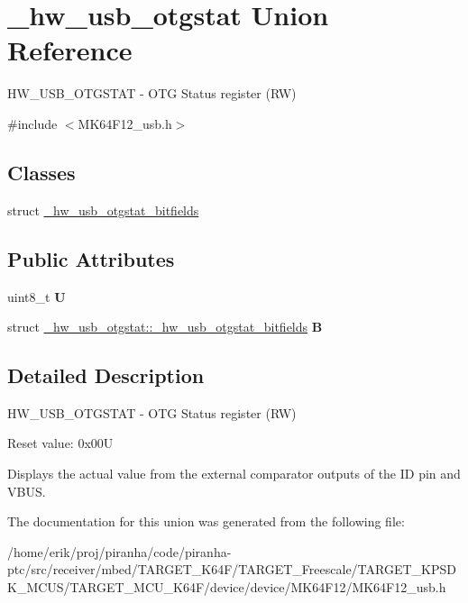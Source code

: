 \hypertarget{union__hw__usb__otgstat}{}\section{\+\_\+hw\+\_\+usb\+\_\+otgstat Union Reference}
\label{union__hw__usb__otgstat}


H\+W\+\_\+\+U\+S\+B\+\_\+\+O\+T\+G\+S\+T\+AT -\/ O\+TG Status register (RW)  




{\ttfamily \#include $<$M\+K64\+F12\+\_\+usb.\+h$>$}

\subsection*{Classes}
\begin{DoxyCompactItemize}
\item 
struct \hyperlink{struct__hw__usb__otgstat_1_1__hw__usb__otgstat__bitfields}{\+\_\+hw\+\_\+usb\+\_\+otgstat\+\_\+bitfields}
\end{DoxyCompactItemize}
\subsection*{Public Attributes}
\begin{DoxyCompactItemize}
\item 
uint8\+\_\+t {\bfseries U}\hypertarget{union__hw__usb__otgstat_ab99fc21beed2694667260b17464eca76}{}\label{union__hw__usb__otgstat_ab99fc21beed2694667260b17464eca76}

\item 
struct \hyperlink{struct__hw__usb__otgstat_1_1__hw__usb__otgstat__bitfields}{\+\_\+hw\+\_\+usb\+\_\+otgstat\+::\+\_\+hw\+\_\+usb\+\_\+otgstat\+\_\+bitfields} {\bfseries B}\hypertarget{union__hw__usb__otgstat_aacf9a8bd13c4f3cd526ed2afe9b4d3a3}{}\label{union__hw__usb__otgstat_aacf9a8bd13c4f3cd526ed2afe9b4d3a3}

\end{DoxyCompactItemize}


\subsection{Detailed Description}
H\+W\+\_\+\+U\+S\+B\+\_\+\+O\+T\+G\+S\+T\+AT -\/ O\+TG Status register (RW) 

Reset value\+: 0x00U

Displays the actual value from the external comparator outputs of the ID pin and V\+B\+US. 

The documentation for this union was generated from the following file\+:\begin{DoxyCompactItemize}
\item 
/home/erik/proj/piranha/code/piranha-\/ptc/src/receiver/mbed/\+T\+A\+R\+G\+E\+T\+\_\+\+K64\+F/\+T\+A\+R\+G\+E\+T\+\_\+\+Freescale/\+T\+A\+R\+G\+E\+T\+\_\+\+K\+P\+S\+D\+K\+\_\+\+M\+C\+U\+S/\+T\+A\+R\+G\+E\+T\+\_\+\+M\+C\+U\+\_\+\+K64\+F/device/device/\+M\+K64\+F12/M\+K64\+F12\+\_\+usb.\+h\end{DoxyCompactItemize}

